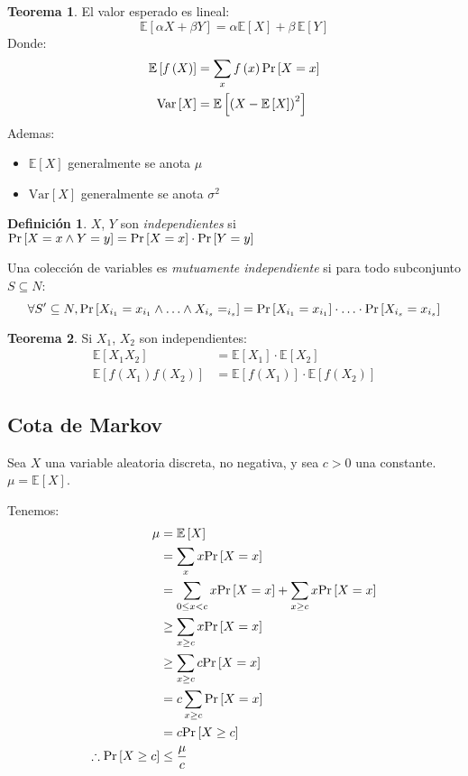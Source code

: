 \documentclass[english, spanish, fleqn, 10pt]{article}
\numberwithin{equation}{section}
\newcommand{\nparentesis}[1]{\left( #1 \right)}
\newcommand{\ncorchetes}[1]{\left[ #1 \right]}
\theoremstyle{definition}
\newtheorem{teorema}{Teorema}[section]
\newtheorem{definition}{Definición}[section]
\newcommand{\esperanza}[1]{\mathbb{E}\ncorchetes{#1}}
\begin{document}
\begin{teorema}
	El valor esperado es lineal:
	\begin{equation*}
	\esperanza{\alpha X + \beta Y} = \alpha \esperanza{X} + \beta\, \esperanza{Y}
	\end{equation*}
	Donde:
	\begin{align*}
	\esperanza{f\nparentesis{X}} &= \sum_x f\nparentesis{x} \pr{X=x}\\
	\mathrm{Var}\ncorchetes{X} &= \esperanza{\nparentesis{X-\esperanza{X}}^2}
	\end{align*}
	Ademas:
	\begin{itemize}
		\item $\esperanza{X}$ generalmente se anota $\mu$
		\item $\mathrm{Var}\ncorchetes{X}$ generalmente se anota $\sigma^2$
	\end{itemize}
\end{teorema}
\begin{definition}
	$X$, $Y$  son \emph{independientes} si $\pr{X = x\wedge Y = y} = \pr{X = x}\cdot \pr{Y = y}$
\end{definition}
Una colección de variables es \emph{mutuamente independiente} si para todo subconjunto $S\subseteq N$:
\begin{equation*}
\forall S' \subseteq N, \pr{X_{i_1}=x_{i_1}\wedge \ldots \wedge X_{i_s} = _{i_s}}= \pr{X_{i_1} = x_{i_1}}\cdot \ldots \cdot \pr{X_{i_s} = x_{i_s}}
\end{equation*}

\begin{teorema}
	Si $X_1$, $X_2$ son independientes:
	\begin{align*}
	\esperanza{X_1 X_2} &= \esperanza{X_1} \cdot \esperanza{X_2}\\
	\esperanza{f\nparentesis{X_1}f\nparentesis{X_2}} &= \esperanza{f\nparentesis{X_1}}\cdot \esperanza{f\nparentesis{X_2}}
	\end{align*}
\end{teorema}

\subsection{Cota de Markov}
Sea $X$ una variable aleatoria discreta, no negativa, y sea $c >0$ una constante. $\mu = \esperanza{X}$.

Tenemos:
\begin{align*}
\mu &= \esperanza{X}\\
&= \sum_x x\pr{X = x}\\
&= \sum_{0 \leq x < c} x \pr{X=x} + \sum_{x \geq c} x\pr{X = x}\\
&\geq \sum_{x \geq c} x \pr{X = x}\\
&\geq \sum_{x \geq c} c \pr{X=x}\\
&= c \sum_{x \geq c} \pr{X=x}\\
&= c\pr{X\geq c}\\
\therefore \pr{X \geq c} &\leq \dfrac{\mu}{c}
\end{align*}
\end{document}
